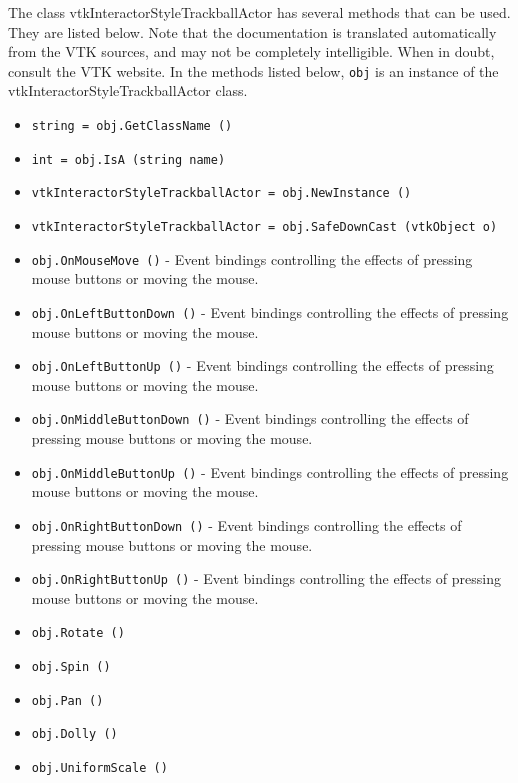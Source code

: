 The class vtkInteractorStyleTrackballActor has several methods that can be used.
  They are listed below.
Note that the documentation is translated automatically from the VTK sources,
and may not be completely intelligible.  When in doubt, consult the VTK website.
In the methods listed below, \verb|obj| is an instance of the vtkInteractorStyleTrackballActor class.
\begin{itemize}
\item  \verb|string = obj.GetClassName ()|

\item  \verb|int = obj.IsA (string name)|

\item  \verb|vtkInteractorStyleTrackballActor = obj.NewInstance ()|

\item  \verb|vtkInteractorStyleTrackballActor = obj.SafeDownCast (vtkObject o)|

\item  \verb|obj.OnMouseMove ()| -  Event bindings controlling the effects of pressing mouse buttons
 or moving the mouse.

\item  \verb|obj.OnLeftButtonDown ()| -  Event bindings controlling the effects of pressing mouse buttons
 or moving the mouse.

\item  \verb|obj.OnLeftButtonUp ()| -  Event bindings controlling the effects of pressing mouse buttons
 or moving the mouse.

\item  \verb|obj.OnMiddleButtonDown ()| -  Event bindings controlling the effects of pressing mouse buttons
 or moving the mouse.

\item  \verb|obj.OnMiddleButtonUp ()| -  Event bindings controlling the effects of pressing mouse buttons
 or moving the mouse.

\item  \verb|obj.OnRightButtonDown ()| -  Event bindings controlling the effects of pressing mouse buttons
 or moving the mouse.

\item  \verb|obj.OnRightButtonUp ()| -  Event bindings controlling the effects of pressing mouse buttons
 or moving the mouse.

\item  \verb|obj.Rotate ()|

\item  \verb|obj.Spin ()|

\item  \verb|obj.Pan ()|

\item  \verb|obj.Dolly ()|

\item  \verb|obj.UniformScale ()|

\end{itemize}
